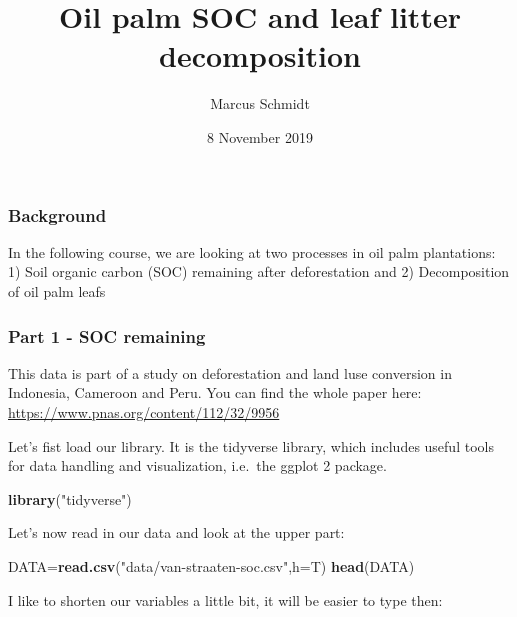 \documentclass[
]{article}
\title{Oil palm SOC and leaf litter decomposition}
\author{Marcus Schmidt}
\date{8 November 2019}
\newenvironment{Shaded}{\begin{snugshade}}{\end{snugshade}}
\newcommand{\DataTypeTok}[1]{\textcolor[rgb]{0.13,0.29,0.53}{#1}}
\newcommand{\KeywordTok}[1]{\textcolor[rgb]{0.13,0.29,0.53}{\textbf{#1}}}
\newcommand{\NormalTok}[1]{#1}
\newcommand{\OperatorTok}[1]{\textcolor[rgb]{0.81,0.36,0.00}{\textbf{#1}}}
\newcommand{\StringTok}[1]{\textcolor[rgb]{0.31,0.60,0.02}{#1}}
\begin{document}
\maketitle

\hypertarget{background}{%
\subsubsection{Background}\label{background}}

In the following course, we are looking at two processes in oil palm
plantations: 1) Soil organic carbon (SOC) remaining after deforestation
and 2) Decomposition of oil palm leafs

\hypertarget{part-1---soc-remaining}{%
\subsubsection{Part 1 - SOC remaining}\label{part-1---soc-remaining}}

This data is part of a study on deforestation and land luse conversion
in Indonesia, Cameroon and Peru. You can find the whole paper here:
\url{https://www.pnas.org/content/112/32/9956}

Let's fist load our library. It is the tidyverse library, which includes
useful tools for data handling and visualization, i.e.~the ggplot 2
package.

\begin{Shaded}
\begin{Highlighting}[]
\KeywordTok{library}\NormalTok{(}\StringTok{"tidyverse"}\NormalTok{)}
\end{Highlighting}
\end{Shaded}

Let's now read in our data and look at the upper part:

\begin{Shaded}
\begin{Highlighting}[]
\NormalTok{DATA=}\KeywordTok{read.csv}\NormalTok{(}\StringTok{"data/van-straaten-soc.csv"}\NormalTok{,}\DataTypeTok{h=}\NormalTok{T)}
\KeywordTok{head}\NormalTok{(DATA)}
\end{Highlighting}
\end{Shaded}

I like to shorten our variables a little bit, it will be easier to type
then:

\begin{Shaded}
\end{Shaded}
\end{document}

